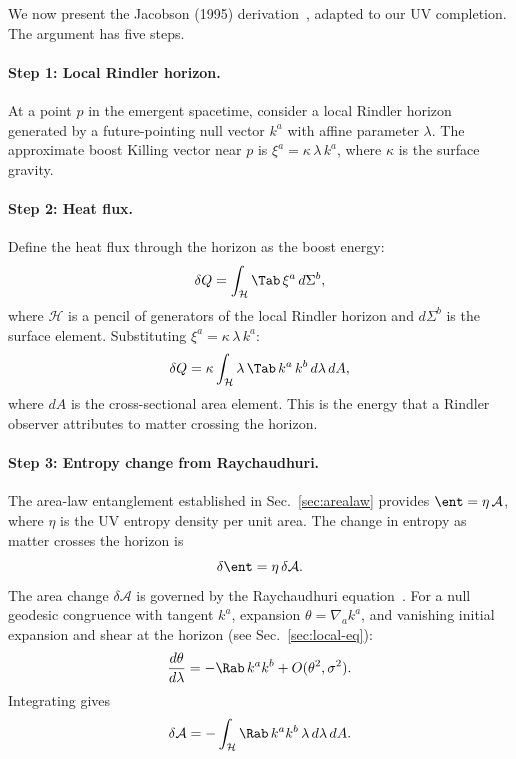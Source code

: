 We now present the Jacobson (1995) derivation~\cite{Jacobson1995},
adapted to our UV completion.  The argument has five steps.

\paragraph{Step 1: Local Rindler horizon.}
At a point $p$ in the emergent spacetime, consider a local Rindler
horizon generated by a future-pointing null vector $k^a$ with affine
parameter $\lambda$.  The approximate boost Killing vector near $p$ is
$\xi^a = \kappa\, \lambda\, k^a$, where $\kappa$ is the surface
gravity.

\paragraph{Step 2: Heat flux.}
Define the heat flux through the horizon as the boost energy:
\begin{equation}
  \delta Q = \int_{\mathcal{H}} \Tab\, \xi^a\, d\Sigma^b,
  \label{eq:heat-flux}
\end{equation}
where $\mathcal{H}$ is a pencil of generators of the local Rindler
horizon and $d\Sigma^b$ is the surface element.  Substituting
$\xi^a = \kappa\,\lambda\, k^a$:
\begin{equation}
  \delta Q = \kappa \int_{\mathcal{H}} \lambda\, \Tab\, k^a\, k^b\, d\lambda\, dA,
  \label{eq:heat-flux-expanded}
\end{equation}
where $dA$ is the cross-sectional area element.  This is the energy
that a Rindler observer attributes to matter crossing the horizon.

\paragraph{Step 3: Entropy change from Raychaudhuri.}
The area-law entanglement established in Sec.~\ref{sec:arealaw}
provides $\ent = \eta\, \mathcal{A}$, where $\eta$ is the UV entropy
density per unit area.  The change in entropy as matter crosses the
horizon is
\begin{equation}
  \delta \ent = \eta\, \delta\mathcal{A}.
  \label{eq:ds-area}
\end{equation}
The area change $\delta\mathcal{A}$ is governed by the Raychaudhuri
equation~\cite{Wald1984}.  For a null geodesic congruence with tangent
$k^a$, expansion $\theta = \nabla_a k^a$, and vanishing initial
expansion and shear at the horizon (see Sec.~\ref{sec:local-eq}):
\begin{equation}
  \frac{d\theta}{d\lambda} = -\Rab\, k^a k^b + O(\theta^2, \sigma^2).
  \label{eq:raychaudhuri}
\end{equation}
Integrating gives
\begin{equation}
  \delta\mathcal{A} = -\int_{\mathcal{H}} \Rab\, k^a k^b\, \lambda\, d\lambda\, dA.
  \label{eq:delta-area}
\end{equation}

